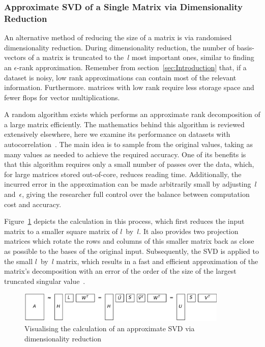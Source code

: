 \documentclass[ijgi,article,submit,moreauthors,pdftex,10pt,a4paper]{Definitions/mdpi}
\begin{document}
\subsubsection{Approximate SVD of a Single Matrix via Dimensionality Reduction}
\label{sec:Results/Approximate SVD of a Single Matrix via Dimensionality Reduction}

An alternative method of reducing the size of a matrix is via randomised dimensionality reduction. During dimensionality reduction, the number of basis-vectors of a matrix is truncated to the~$l$ most important ones, similar to finding an $\epsilon$-rank approximation. Remember from section~\ref{sec:Introduction} that, if a dataset is noisy, low rank approximations can contain most of the relevant information. Furthermore. matrices with low rank require less storage space and fewer flops for vector multiplications.

A random algorithm exists which performs an approximate rank decomposition of a large matrix efficiently. The mathematics behind this algorithm is reviewed extensively elsewhere, here we examine its performance on datasets with autocorrelation~\cite{Halko2011, Li2016}. The main idea is to sample from the original values, taking as many values as needed to achieve the required accuracy. One of its benefits is that this algorithm requires only a small number of passes over the data, which, for large matrices stored out-of-core, reduces reading time. Additionally, the incurred error in the approximation can be made arbitrarily small by adjusting~$l$ and~$\epsilon$, giving the researcher full control over the balance between computation cost and accuracy.

Figure~\ref{fig:reduceSizeRandomisedSquare} depicts the calculation in this process, which first reduces the input matrix to a smaller square matrix of $l$~by~$l$. It also provides two projection matrices which rotate the rows and columns of this smaller matrix back as close as possible to the bases of the original input. Subsequently, the SVD is applied to the small $l$~by~$l$ matrix, which results in a fast and efficient approximation of the matrix's decomposition with an error of the order of the size of the largest truncated singular value~\cite{Martinsson2016, Halko2011}.

\begin{figure}[H]
\centering
\includegraphics[width=100mm]{Results/reduceSizeRandomisedSquare.pdf}
\caption[Approximate randomised SVD]{Visualising the calculation of an approximate SVD via dimensionality reduction}
\label{fig:reduceSizeRandomisedSquare}
\end{figure}
\end{document}

